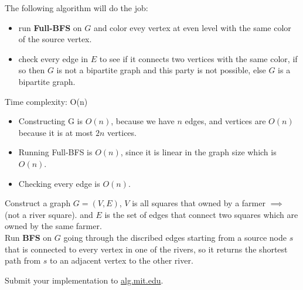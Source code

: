 \documentclass[12pt,twoside]{article}
\begin{document}
\begin{problems}
  The following algorithm will do the job:
  \begin{itemize}
    \item run \textbf{Full-BFS} on $G$ and color evey vertex at even level with the same color of the source vertex.
    \item check every edge in $E$ to see if it connects two vertices with the same color, 
      if so then $G$ is not a bipartite graph and this party is not possible, else $G$ is a bipartite graph.
  \end{itemize}

  Time complexity: O(n)
  \begin{itemize}
  \item Constructing G is $O(n)$, because we have $n$ edges, and vertices are $O(n)$
    because it is at most $2n$ vertices.
  \item Running Full-BFS is $O(n)$, since it is linear in the graph size which is $O(n)$.
  \item Checking every edge is $O(n)$.
  \end{itemize}

\newpage
\problem  %
  Construct a graph $G = (V, E)$, $V$ is all squares that owned by a farmer $\implies$ (not a river square). 
  and $E$ is the set of edges that connect two squares which are owned by the same farmer. \\
  Run \textbf{BFS} on $G$ going through the discribed edges starting from a source node $s$ that is connected 
  to every vertex in one of the rivers, so it returns the shortest path from $s$ to an adjacent vertex to the other river.
  
  
  

  

\newpage
\problem  %

\newpage
\problem  %

\begin{problemparts}
\problempart %
\problempart %
\problempart %
\problempart Submit your implementation to {\small\url{alg.mit.edu}}.
\end{problemparts}

\end{problems}
\end{document}
